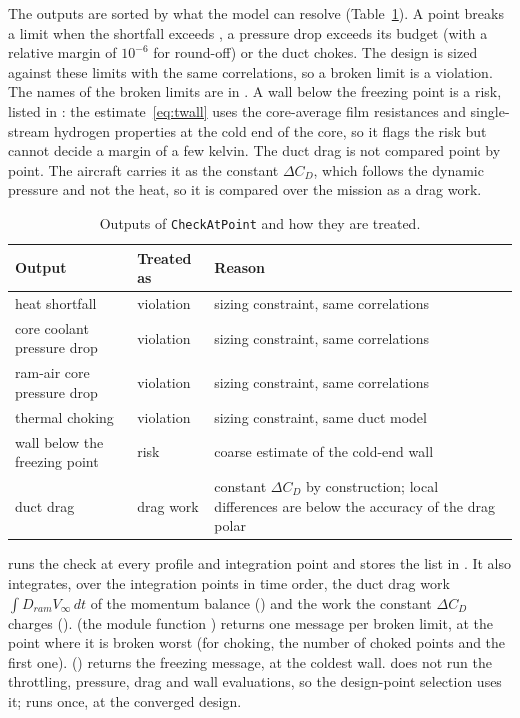 \documentclass[a4paper,11pt]{article}
\begin{document}
The outputs are sorted by what the model can resolve (Table~\ref{tab:fidelity}). A point
breaks a limit when the shortfall exceeds , a pressure drop
exceeds its budget (with a relative margin of $10^{-6}$ for round-off) or the duct chokes. The
design is sized against these limits with the same correlations, so a broken limit is a
violation. The names of the broken limits are in . A wall below the freezing
point is a risk, listed in : the estimate~\eqref{eq:twall} uses the
core-average film resistances and single-stream hydrogen properties at the cold end of the
core, so it flags the risk but cannot decide a margin of a few kelvin. The duct drag is not
compared point by point. The aircraft carries it as the constant $\Delta C_D$, which follows
the dynamic pressure and not the heat, so it is compared over the mission as a drag work.

\begin{table}[htbp]
\centering\small
\caption{Outputs of \texttt{CheckAtPoint} and how they are treated.}\label{tab:fidelity}
\begin{tabular}{@{}p{4.6cm}p{1.6cm}p{7.2cm}@{}}
\toprule
Output & Treated as & Reason \\
\midrule
heat shortfall & violation & sizing constraint, same correlations \\
core coolant pressure drop & violation & sizing constraint, same correlations \\
ram-air core pressure drop & violation & sizing constraint, same correlations \\
thermal choking & violation & sizing constraint, same duct model \\
wall below the freezing point & risk & coarse estimate of the cold-end wall \\
duct drag & drag work & constant $\Delta C_D$ by construction; local differences are below the accuracy of the drag polar \\
\bottomrule
\end{tabular}
\end{table}

 runs the check at every profile and
integration point and stores the list in . It also integrates, over the
integration points in time order, the duct drag work $\int D_{ram} V_\infty\,dt$ of the
momentum balance () and the work the constant $\Delta C_D$
charges ().  (the module
function ) returns one message per broken limit, at the point where
it is broken worst (for choking, the number of choked points and the first one).
 () returns the freezing message, at the coldest
wall.  does not run the
throttling, pressure, drag and wall evaluations, so the design-point selection uses it;
 runs once, at the converged design.
\end{document}
